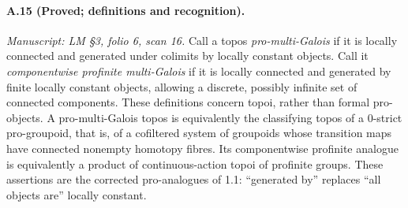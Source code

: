 \paragraph{A.15 (Proved; definitions and recognition).}
\textit{Manuscript: LM \S3, folio 6, scan 16.}
Call a topos \emph{pro-multi-Galois} if it is locally connected and generated under colimits by locally constant objects. Call it \emph{componentwise profinite multi-Galois} if it is locally connected and generated by finite locally constant objects, allowing a discrete, possibly infinite set of connected components. These definitions concern topoi, rather than formal pro-objects. A pro-multi-Galois topos is equivalently the classifying topos of a $0$-strict pro-groupoid, that is, of a cofiltered system of groupoids whose transition maps have connected nonempty homotopy fibres. Its componentwise profinite analogue is equivalently a product of continuous-action topoi of profinite groups. These assertions are the corrected pro-analogues of 1.1: ``generated by'' replaces ``all objects are'' locally constant.
